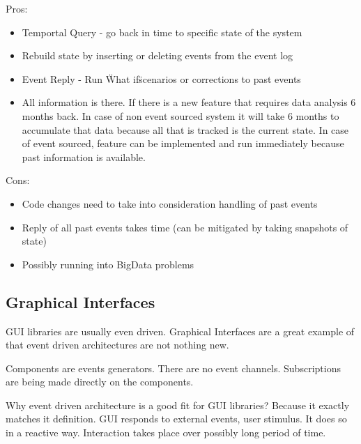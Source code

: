 \documentclass[12pt, a4paper]{article}
\begin{document}
Pros:
\begin{itemize}
  \item Temportal Query - go back in time to specific state of the system
  \item Rebuild state by inserting or deleting events from the event log
  \item Event Reply - Run \"What if\" scenarios or corrections to past events
  \item All information is there. If there is a new feature that requires data analysis 6 months back. In case of non event sourced system it will take 6 months to accumulate that data because all that is tracked is the current state. In case of event sourced, feature can be implemented and run immediately because past information is available.
\end{itemize}

Cons:
\begin{itemize}
  \item Code changes need to take into consideration handling of past events
  \item Reply of all past events takes time (can be mitigated by taking snapshots of state)
  \item Possibly running into BigData problems
\end{itemize}

\subsection{Graphical Interfaces}
GUI libraries are usually even driven. Graphical Interfaces are a great example of that event driven architectures are not nothing new. 

Components are events generators. There are no event channels. Subscriptions are being made directly on the components.

Why event driven architecture is a good fit for GUI libraries? Because it exactly matches it definition. GUI responds to external events, user stimulus. It does so in a reactive way. Interaction takes place over possibly long period of time.


  

\nocite{*}


\end{document}
